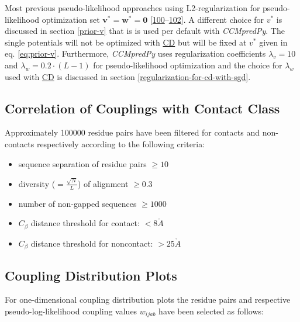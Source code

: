 \documentclass[11pt,a4paper,twoside]{book}
\providecommand{\tightlist}{%
  \setlength{\itemsep}{0pt}\setlength{\parskip}{0pt}}
\newcommand{\Cb}{C_\beta}
\newcommand{\eq}{\!=\!}
\renewcommand{\v}{\mathbf{v}}
\newcommand{\w}{\mathbf{w}}
\newcommand{\wijab}{w_{ijab}}
\newcommand{\angstrom}{\mathring{A} \;}
\theoremstyle{definition}
\theoremstyle{definition}
\theoremstyle{remark}
\begin{document}
Most previous pseudo-likelihood approaches using L2-regularization for
pseudo-likelihood optimization set \(\v^* \eq \w^* \eq \mathbf{0}\)
{[}\protect\hyperlink{ref-Seemayer2014}{100}--\protect\hyperlink{ref-Kamisetty2013}{102}{]}.
A different choice for \(v^*\) is discussed in section \ref{prior-v}
that is is used per default with \emph{CCMpredPy}. The single potentials
will not be optimized with \protect\hyperlink{abbrev}{CD} but will be
fixed at \(v^*\) given in eq. \eqref{eq:prior-v}. Furthermore,
\emph{CCMpredPy} uses regularization coefficients \(\lambda_v \eq 10\)
and \(\lambda_w \eq 0.2\cdot(L-1)\) for pseudo-likelihood optimization
and the choice for \(\lambda_w\) used with
\protect\hyperlink{abbrev}{CD} is discussed in section
\ref{regularization-for-cd-with-sgd}.

\subsection{Correlation of Couplings with Contact
Class}\label{method-coupling-correlation}

Approximately 100000 residue pairs have been filtered for contacts and
non-contacts respectively according to the following criteria:

\begin{itemize}
\tightlist
\item
  sequence separation of residue pairs \(\ge 10\)
\item
  diversity (\(=\frac{\sqrt{N}}{L}\)) of alignment \(\ge 0.3\)
\item
  number of non-gapped sequences \(\ge 1000\)
\item
  \(\Cb\) distance threshold for contact: \(<8\angstrom\)
\item
  \(\Cb\) distance threshold for noncontact: \(>25\angstrom\)
\end{itemize}

\subsection{Coupling Distribution Plots}\label{method-coupling-profile}

For one-dimensional coupling distribution plots the residue pairs and
respective pseudo-log-likelihood coupling values \(\wijab\) have been
selected as follows:
\end{document}
